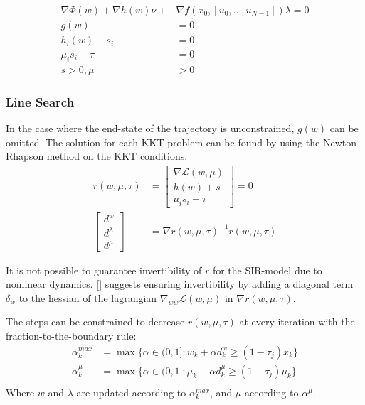 \begin{align}
        \nabla \Phi(w) + \nabla h(w)\nu + &\nabla f(x_0, [u_0, \dots, u_{N-1}])\lambda = 0 \nonumber \\ 
        g(w) &= 0\nonumber \label{eq:KKT_approx_IPOPT}\\
    h_i(w) + s_i &= 0\\\nonumber
    \mu_is_i-\tau &= 0\\\nonumber
    s > 0, \mu &> 0
\end{align}

\subsubsection{Line Search}
In the case where the end-state of the trajectory is unconstrained, $g(w)$ can be omitted. The solution for each KKT problem can be found by using the Newton-Rhapson method on the KKT conditions. 
\begin{align}
    r(w, \mu, \tau) &= \begin{bmatrix}
    \nabla \mathcal{L}(w, \mu)\\
    h(w) + s\\
    \mu_is_i - \tau
    \end{bmatrix} = 0\\
    \begin{bmatrix}
    d^w\\d^\lambda\\d^\mu
    \end{bmatrix} &= \nabla r(w, \mu, \tau)^{-1} r(w, \mu, \tau)
\end{align}

It is not possible to guarantee invertibility of $r$ for the SIR-model due to nonlinear dynamics. [\cite{IPOPT_output_ref}] suggests ensuring invertibility by adding a diagonal term $\delta_w$ to the hessian of the lagrangian $\nabla_{ww}\mathcal{L}(w, \mu)$ in $\nabla r(w,\mu, \tau)$.

The steps can be constrained to decrease $r(w, \mu, \tau)$ at every iteration with the fraction-to-the-boundary rule:
\begin{align}
    \alpha_k^{max} &= \max \{\alpha \in (0,1]: w_k + \alpha d_k^w \geq (1-\tau_j)x_k\}\\
     \alpha_k^{\mu} &= \max \{\alpha \in (0,1]: \mu_k + \alpha d_k^\mu \geq (1-\tau_j)\mu_k\}\\
\end{align}
Where $w$ and $\lambda$ are updated according to $\alpha_k^{max}$, and $\mu$ according to $\alpha^\mu$.

